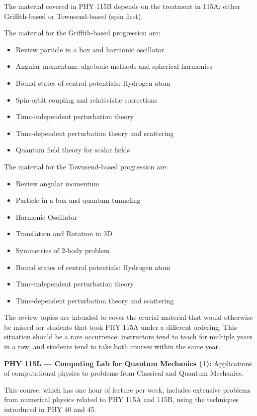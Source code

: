 \documentclass[12pt]{article}
\begin{document}
The material covered in PHY 115B depends on the treatment in 115A: either Griffith-based or Townsend-based (spin first).

The material for the Griffith-based progression are:
\begin{itemize}
\item Review particle in a box and harmonic oscillator 
\item Angular momentum: algebraic methods and spherical harmonics
\item Bound states of central potentials: Hydrogen atom
\item Spin-orbit coupling and relativistic corrections
\item Time-independent perturbation theory
\item Time-dependent perturbation theory and scattering
\item Quantum field theory for scalar fields
\end{itemize}

The material for the Townsend-based progression are:
\begin{itemize}
\item Review angular momentum 
\item Particle in a box and quantum tunneling
\item Harmonic Oscillator
\item Translation and Rotation in 3D
\item Symmetries of 2-body problem 
\item Bound states of central potentials: Hydrogen atom
\item Time-independent perturbation theory
\item Time-dependent perturbation theory and scattering
\end{itemize}

The review topics are intended to cover the crucial material that would
otherwise be missed for students that took PHY 115A under a different
ordering.  This situation should be a rare occurrence: instructors tend
to teach for multiple years in a row, and students tend to take both
courses within the same year.

\vskip 1cm
\noindent
{\bf PHY 115L --- Computing Lab for Quantum Mechanics (1):}
Applications of computational physics to problems from Classical and Quantum Mechanics.

This course, which has one hour of lecture per week, includes
extensive problems from numerical physics related to PHY 115A and 115B,
using the techniques introduced in PHY 40 and 45.
\end{document}
